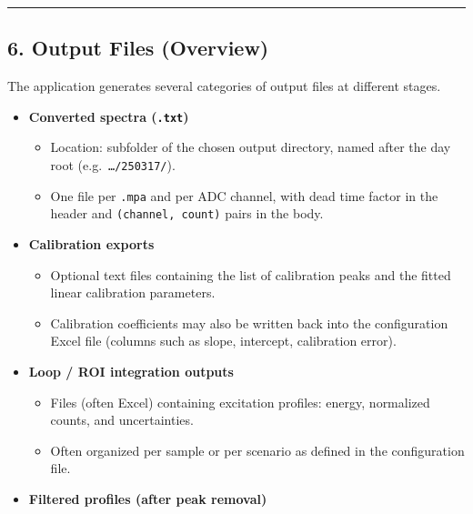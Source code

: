 \begin{center}\rule{0.5\linewidth}{0.5pt}\end{center}

\hypertarget{output-files-overview}{%
\subsection{6. Output Files (Overview)}\label{output-files-overview}}

The application generates several categories of output files at
different stages.

\begin{itemize}
\tightlist
\item
  \textbf{Converted spectra (\texttt{.txt})}

  \begin{itemize}
  \tightlist
  \item
    Location: subfolder of the chosen output directory, named after the
    day root (e.g.~\texttt{\ldots{}/250317/}).\\
  \item
    One file per \texttt{.mpa} and per ADC channel, with dead time
    factor in the header and \texttt{(channel,\ count)} pairs in the
    body.
  \end{itemize}
\item
  \textbf{Calibration exports}

  \begin{itemize}
  \tightlist
  \item
    Optional text files containing the list of calibration peaks and the
    fitted linear calibration parameters.\\
  \item
    Calibration coefficients may also be written back into the
    configuration Excel file (columns such as slope, intercept,
    calibration error).
  \end{itemize}
\item
  \textbf{Loop / ROI integration outputs}

  \begin{itemize}
  \tightlist
  \item
    Files (often Excel) containing excitation profiles: energy,
    normalized counts, and uncertainties.\\
  \item
    Often organized per sample or per scenario as defined in the
    configuration file.
  \end{itemize}
\item
  \textbf{Filtered profiles (after peak removal)}


\end{itemize}
